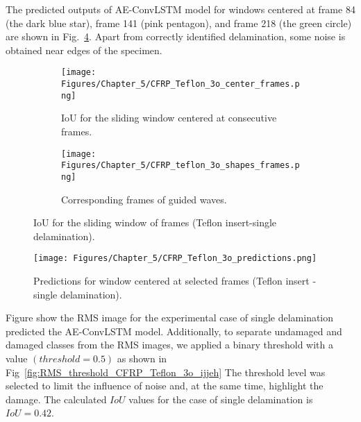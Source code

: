 The predicted outputs of AE-ConvLSTM model for windows centered at frame 84 (the dark blue star), frame 141 (pink pentagon), and frame 218 (the green circle) are shown in Fig.~\ref{fig:CFRP_Teflon_3o_predictions}.
Apart from correctly identified delamination, some noise is obtained near edges of the specimen.
\begin{figure} [!h]
	\begin{subfigure}[b]{1\textwidth}
		\centering
	\texttt{[image: Figures/Chapter\_5/CFRP\_Teflon\_3o\_center\_frames.png]}
		\caption{IoU for the sliding window centered at consecutive frames.}
		\label{fig:CFRP_Teflon_3o_center_frames}
	\end{subfigure}
	\par\medskip
	\begin{subfigure}[b]{1\textwidth}
		\centering
		\texttt{[image: Figures/Chapter\_5/CFRP\_teflon\_3o\_shapes\_frames.png]}
		\caption{Corresponding frames of guided waves.} 
		\label{fig:CFRP_teflon_3o_preds_frames}
	\end{subfigure}
	\caption{IoU for the sliding window of frames (Teflon insert-single delamination).}
	\label{fig:CFRP_Teflon_3o_IoU_centre_window}
\end{figure} 

\begin{figure}[!ht]
	\centering
	\texttt{[image: Figures/Chapter\_5/CFRP\_Teflon\_3o\_predictions.png]}
	\caption{Predictions for window centered at selected frames (Teflon insert - single delamination).}
	\label{fig:CFRP_Teflon_3o_predictions}
\end{figure}
Figure show the RMS image for the experimental case of single delamination predicted the AE-ConvLSTM model.
Additionally, to separate undamaged and damaged classes from the RMS images, we applied a binary threshold with a value \((threshold=0.5)\) as shown in Fig~\ref{fig:RMS_threshold_CFRP_Teflon_3o_ijjeh} 
The threshold level was selected to limit the influence of noise and, at the same time, highlight the damage.
The calculated \(IoU\) values for the case of single delamination is \(IoU=0.42\).

